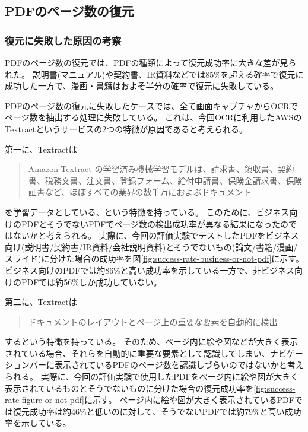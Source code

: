 
\subsection{PDFのページ数の復元}

\subsubsection{復元に失敗した原因の考察}
PDFのページ数の復元では、PDFの種類によって復元成功率に大きな差が見られた。
説明書(マニュアル)や契約書、IR資料などでは85\%を超える確率で復元に成功した一方で、漫画・書籍はおよそ半分の確率で復元に失敗している。

PDFのページ数の復元に失敗したケースでは、全て画面キャプチャからOCRでページ数を抽出する処理に失敗している。
これは、今回OCRに利用したAWSのTextractというサービスの2つの特徴が原因であると考えられる。

第一に、Textractは
\begin{quote}
Amazon Textract の学習済み機械学習モデルは、請求書、領収書、契約書、税務文書、注文書、登録フォーム、給付申請書、保険金請求書、保険証書など、ほぼすべての業界の数千万におよぶドキュメント
\end{quote}
を学習データとしている、という特徴を持っている\cite{}。
このために、ビジネス向けのPDFとそうでないPDFでページ数の検出成功率が異なる結果になったのではないかと考えられる。
実際に、今回の評価実験でテストしたPDFをビジネス向け(説明書/契約書/IR資料/会社説明資料)とそうでないもの(論文/書籍/漫画/スライド)に分けた場合の成功率を図\ref{fig:success-rate-business-or-not-pdf}に示す。
ビジネス向けのPDFでは約86\%と高い成功率を示している一方で、非ビジネス向けのPDFでは約56\%しか成功していない。

第二に、Textractは
\begin{quote}
ドキュメントのレイアウトとページ上の重要な要素を自動的に検出
\end{quote}
するという特徴を持っている。
そのため、ページ内に絵や図などが大きく表示されている場合、それらを自動的に重要な要素として認識してしまい、ナビゲーションバーに表示されているPDFのページ数を認識しづらいのではないかと考えられる。
実際に、今回の評価実験で使用したPDFをページ内に絵や図が大きく表示されているものとそうでないものに分けた場合の復元成功率を\ref{fig:success-rate-figure-or-not-pdf}に示す。
ページ内に絵や図が大きく表示されているPDFでは復元成功率は約46\%と低いのに対して、そうでないPDFでは約79\%と高い成功率を示している。

